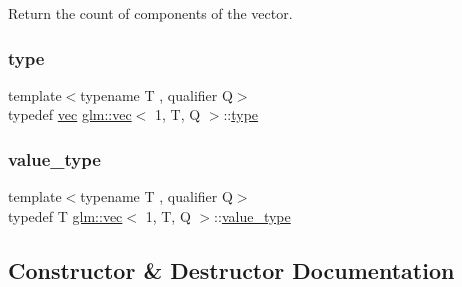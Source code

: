 Return the count of components of the vector. 

\mbox{\label{structglm_1_1vec_3_011_00_01_t_00_01_q_01_4_acc52e9f1fce6c99322df114842a855dd}} 
\subsubsection{\texorpdfstring{type}{type}}
{\footnotesize\ttfamily template$<$typename T , qualifier Q$>$ \\
typedef \mbox{\hyperlink{structglm_1_1vec}{vec}} \mbox{\hyperlink{structglm_1_1vec}{glm\+::vec}}$<$ 1, T, Q $>$\+::\mbox{\hyperlink{structglm_1_1vec_3_011_00_01_t_00_01_q_01_4_acc52e9f1fce6c99322df114842a855dd}{type}}}

\mbox{\label{structglm_1_1vec_3_011_00_01_t_00_01_q_01_4_a0d473625a844d6df09585a2a2eed637c}} 
\subsubsection{\texorpdfstring{value\+\_\+type}{value\_type}}
{\footnotesize\ttfamily template$<$typename T , qualifier Q$>$ \\
typedef T \mbox{\hyperlink{structglm_1_1vec}{glm\+::vec}}$<$ 1, T, Q $>$\+::\mbox{\hyperlink{structglm_1_1vec_3_011_00_01_t_00_01_q_01_4_a0d473625a844d6df09585a2a2eed637c}{value\+\_\+type}}}



\subsection{Constructor \& Destructor Documentation}
\mbox{\label{structglm_1_1vec_3_011_00_01_t_00_01_q_01_4_a4fda39784b2ba699a88c6a4c2b94fc7b}} 
